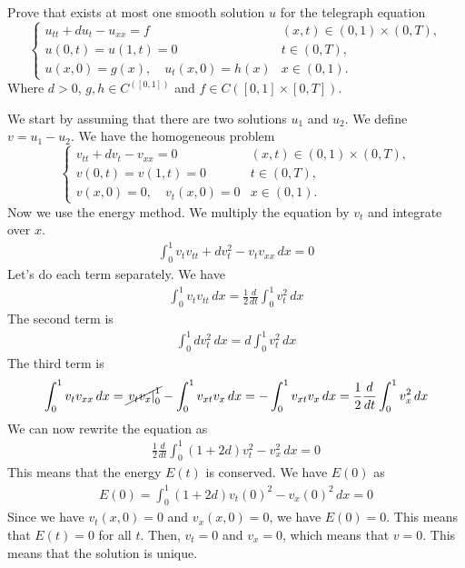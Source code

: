 \begin{exercise}
    Prove that exists at most one smooth solution \(u\) for the telegraph equation
    \[
        \begin{cases}
            u_{tt} + d u_t - u_{xx} = f & (x, t) \in (0,1) \times (0, T), \\
            u(0, t) = u(1, t) = 0 & t \in (0, T), \\
            u(x, 0) = g(x), \quad u_t(x, 0) = h(x) & x \in (0, 1).
        \end{cases}
    \]
    Where \(d > 0\), \(g, h \in C^([0, 1])\) and \(f \in C([0, 1] \times [0, T])\).
\end{exercise}
We start by assuming that there are two solutions \(u_1\) and \(u_2\). We define \(v = u_1 - u_2\). We have the homogeneous problem
\[
    \begin{cases}
        v_{tt} + d v_t - v_{xx} = 0 & (x, t) \in (0,1) \times (0, T), \\
        v(0, t) = v(1, t) = 0 & t \in (0, T), \\
        v(x, 0) = 0, \quad v_t(x, 0) = 0 & x \in (0, 1).
    \end{cases}
\]
Now we use the energy method. We multiply the equation by \(v_t\) and integrate over \(x\).
\[
    \begin{split}
        \int_0^1 v_t v_{tt} + d v_t^2 - v_t v_{xx} \, dx = 0
    \end{split}
\]
Let's do each term separately. We have
\[
    \begin{split}
        \int_0^1 v_t v_{tt} \, dx = \frac{1}{2} \frac{d}{dt} \int_0^1 v_t^2 \, dx
    \end{split}
\]
The second term is
\[
    \begin{split}
        \int_0^1 d v_t^2 \, dx = d \int_0^1 v_t^2 \, dx
    \end{split}
\]
The third term is
\[
    \begin{split}
        \int_0^1 v_t v_{xx} \, dx = \cancel{\left. v_t v_x \right|_0^1} - \int_0^1 v_{xt} v_x \, dx = -\int_0^1 v_{xt} v_x \, dx = \frac{1}{2} \frac{d}{dt} \int_0^1 v_x^2 \, dx
    \end{split}
\]  
We can now rewrite the equation as
\[
    \begin{split}
        \frac{1}{2} \frac{d}{dt} \int_0^1 (1 + 2d) v_t^2 - v_x^2 \, dx = 0
    \end{split}
\]
This means that the energy \(E(t)\) is conserved. We have \(E(0)\) as
\[
    \begin{split}
        E(0) = \int_0^1 (1 + 2d) v_t(0)^2 - v_x(0)^2 \, dx = 0
    \end{split}
\]
Since we have \(v_t(x,0) = 0\) and \(v_x(x,0) = 0\), we have \(E(0) = 0\). This means that \(E(t) = 0\) for all \(t\). Then, \(v_t = 0\) and \(v_x = 0\), which means that \(v = 0\). This means that the solution is unique.

\newpage
